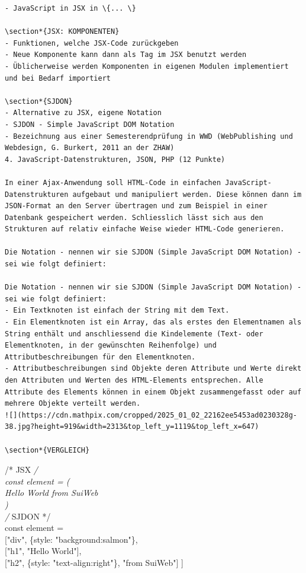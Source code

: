 \begin{verbatim}
- JavaScript in JSX in \{... \}

\section*{JSX: KOMPONENTEN}
- Funktionen, welche JSX-Code zurückgeben
- Neue Komponente kann dann als Tag im JSX benutzt werden
- Üblicherweise werden Komponenten in eigenen Modulen implementiert und bei Bedarf importiert

\section*{SJDON}
- Alternative zu JSX, eigene Notation
- SJDON - Simple JavaScript DOM Notation
- Bezeichnung aus einer Semesterendprüfung in WWD (WebPublishing und Webdesign, G. Burkert, 2011 an der ZHAW)
4. JavaScript-Datenstrukturen, JSON, PHP (12 Punkte)

In einer Ajax-Anwendung soll HTML-Code in einfachen JavaScript-Datenstrukturen aufgebaut und manipuliert werden. Diese können dann im JSON-Format an den Server übertragen und zum Beispiel in einer Datenbank gespeichert werden. Schliesslich lässt sich aus den Strukturen auf relativ einfache Weise wieder HTML-Code generieren.

Die Notation - nennen wir sie SJDON (Simple JavaScript DOM Notation) - sei wie folgt definiert:

Die Notation - nennen wir sie SJDON (Simple JavaScript DOM Notation) - sei wie folgt definiert:
- Ein Textknoten ist einfach der String mit dem Text.
- Ein Elementknoten ist ein Array, das als erstes den Elementnamen als String enthält und anschliessend die Kindelemente (Text- oder Elementknoten, in der gewünschten Reihenfolge) und Attributbeschreibungen für den Elementknoten.
- Attributbeschreibungen sind Objekte deren Attribute und Werte direkt den Attributen und Werten des HTML-Elements entsprechen. Alle Attribute des Elements können in einem Objekt zusammengefasst oder auf mehrere Objekte verteilt werden.
![](https://cdn.mathpix.com/cropped/2025_01_02_22162ee5453ad0230328g-38.jpg?height=919&width=2313&top_left_y=1119&top_left_x=647)

\section*{VERGLEICH}
\end{verbatim}

/* JSX \textit{/\\
const element = (\\

Hello World
from SuiWeb
\\
)\\
/} SJDON */\\
const element =\\[0pt]
["div", \{style: "background:salmon"\},\\[0pt]
["h1", "Hello World"],\\[0pt]
["h2", \{style: "text-align:right"\}, "from SuiWeb"] ]

